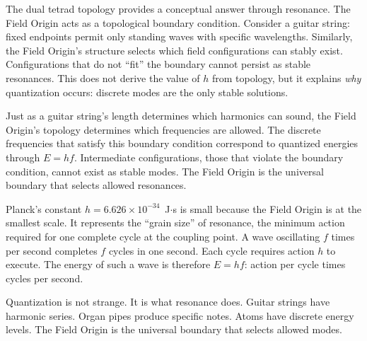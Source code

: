 \documentclass[aps,prd,preprint,superscriptaddress,showpacs,preprintnumbers,amsmath,amssymb,nofootinbib]{revtex4-2}
\begin{document}
The dual tetrad topology provides a conceptual answer through resonance. The Field Origin acts as a topological boundary condition. Consider a guitar string: fixed endpoints permit only standing waves with specific wavelengths. Similarly, the Field Origin's structure selects which field configurations can stably exist. Configurations that do not ``fit'' the boundary cannot persist as stable resonances. This does not derive the value of $h$ from topology, but it explains \emph{why} quantization occurs: discrete modes are the only stable solutions.

Just as a guitar string's length determines which harmonics can sound, the Field Origin's topology determines which frequencies are allowed. The discrete frequencies that satisfy this boundary condition correspond to quantized energies through $E = hf$. Intermediate configurations, those that violate the boundary condition, cannot exist as stable modes. The Field Origin is the universal boundary that selects allowed resonances.

\vspace{1.5em}
\noindent
{}
\vspace{1cm}

Planck's constant $h = 6.626 \times 10^{-34}$~J$\cdot$s is small because the Field Origin is at the smallest scale. It represents the ``grain size'' of resonance, the minimum action required for one complete cycle at the coupling point. A wave oscillating $f$ times per second completes $f$ cycles in one second. Each cycle requires action $h$ to execute. The energy of such a wave is therefore $E = hf$: action per cycle times cycles per second.

Quantization is not strange. It is what resonance does. Guitar strings have harmonic series. Organ pipes produce specific notes. Atoms have discrete energy levels. The Field Origin is the universal boundary that selects allowed modes.
\end{document}
